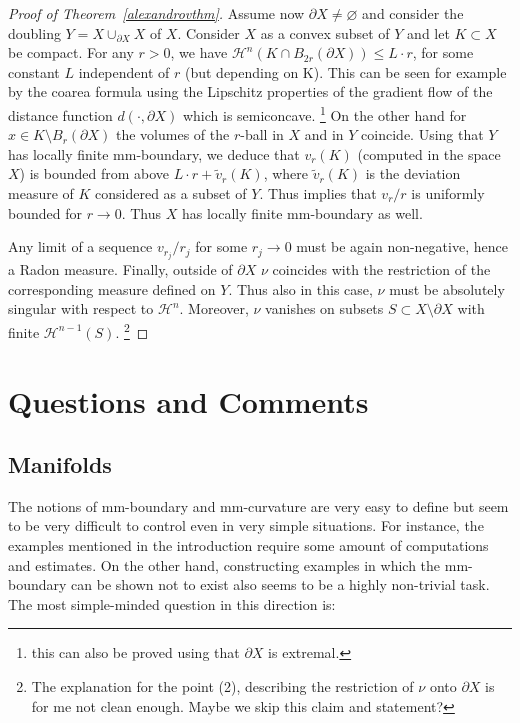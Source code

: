 \documentclass[12pt,leqno]{amsart}
\numberwithin{equation}{section}
\theoremstyle{definition}
\theoremstyle{remark}
\newcommand{\vol}{\mathrm{vol}}
\def\emptyset{\varnothing}
\begin{document}
\begin{proof}[Proof of Theorem~\ref{alexandrovthm}]

Assume now $\partial X\ne\emptyset$ and consider the doubling $Y=X\cup _{\partial X} X$ of $X$. Consider $X$ as a convex subset of $Y$ and let $K\subset X$ be compact. For any $r>0$, we have  $\mathcal H^n (K\cap B_{2r} (\partial X)) \leq L \cdot r$, for some constant $L$ independent of $r$ (but depending on K). {\color{red} This can be seen for example by the coarea formula using the Lipschitz properties of the gradient flow of the distance function $d(\cdot, \partial X)$ which is semiconcave. \footnote {this can also  be proved using that $\partial X$ is extremal.}}  On the other hand for $x\in K\setminus B_r (\partial X)$ the volumes of the $r$-ball in $X$ and in $Y$ coincide.  Using that $Y$ has locally finite mm-boundary, we deduce that $v_r(K)$  (computed in the space $X$) is bounded from above  $L\cdot r + \tilde v_r (K)$, where $\tilde v_r (K)$ is the deviation measure of $K$ considered as a subset of $Y$.  Thus implies that $v_r /r$ is uniformly bounded for $r\to 0$.    Thus $X$ has locally finite mm-boundary as well.

Any limit of a sequence $v_{r_j} /r_j$ for some $r_j\to 0$ must be  again non-negative, hence a Radon measure.  Finally, outside of $\partial X$
   $\nu$ coincides  with the restriction of the corresponding measure defined on $Y$. Thus also in this case, $\nu$ must be absolutely singular with respect to $\mathcal H^n$. Moreover, $\nu$ vanishes on subsets $S\subset X\setminus \partial X$ with finite $\mathcal H^{n-1}  (S)$.  \footnote{The explanation for the point (2), describing the restriction of $\nu$ onto $\partial X$ is for me not clean enough.  Maybe we skip this claim and statement?}
\end{proof}














\section{Questions and Comments} \label{sec:final}
\subsection{Manifolds}
The notions of mm-boundary and mm-curvature are very easy to define but seem to be very difficult to control even in very simple situations.
For instance, the examples mentioned in the introduction require some amount of computations and estimates.  On the other hand, constructing examples in which the mm-boundary can be shown not to exist also seems to be a highly non-trivial task.  The most simple-minded question in this direction is:
\end{document}
